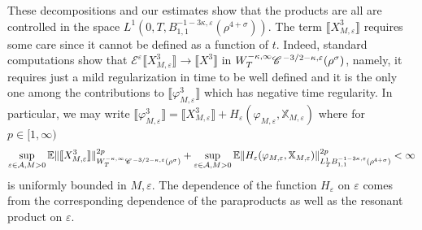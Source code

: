 \documentclass[a4paper,11pt]{article}
\numberwithin{equation}{section}
\newcommand{\CC}{\mathscr{C} \hspace{.1em}}
\begin{document}
These decompositions and our estimates show that the products are all are
controlled in the space $L^1 (0, T, B^{- 1 - 3 \kappa, \varepsilon}_{1, 1}
(\rho^{4 + \sigma}))$. The term $\llbracket X^3_{M, \varepsilon} \rrbracket$
requires some care since it cannot be defined as a function of $t$. Indeed,
standard computations show that $\mathcal{E}^{\varepsilon} \llbracket X^3_{M,
\varepsilon} \rrbracket \rightarrow \llbracket X^3 \rrbracket$ in $W^{-
\kappa, \infty}_T \CC^{- 3 / 2 - \kappa, \varepsilon} (\rho^{\sigma})$,
namely, it requires just a mild regularization in time to be well defined and
it is the only one among the contributions to $\llbracket \varphi_{M,
\varepsilon}^3 \rrbracket$ which has negative time regularity. In particular,
we may write $\llbracket \varphi_{M, \varepsilon}^3 \rrbracket = \llbracket
X_{M, \varepsilon}^3 \rrbracket + H_{\varepsilon} (\varphi_{M, \varepsilon},
\mathbb{X}_{M, \varepsilon})$ where for $p \in [1, \infty)$
\[ \sup_{\varepsilon \in \mathcal{A}, M > 0} \mathbb{E} \| \llbracket X_{M,
   \varepsilon}^3 \rrbracket \|^{2 p}_{W^{- \kappa, \infty}_T \CC^{- 3 / 2 -
   \kappa, \varepsilon} (\rho^{\sigma})} + \sup_{\varepsilon \in \mathcal{A},
   M > 0} \mathbb{E} \| H_{\varepsilon} (\varphi_{M, \varepsilon},
   \mathbb{X}_{M, \varepsilon}) \|^{2 p}_{L^1_T B^{- 1 - 3 \kappa,
   \varepsilon}_{1, 1} (\rho^{4 + \sigma})} < \infty \]
is uniformly bounded in $M, \varepsilon$. The dependence of the function $H_{\varepsilon}$ on $\varepsilon$ comes from the corresponding dependence of the paraproducts as well as the resonant product on $\varepsilon$.
\end{document}
